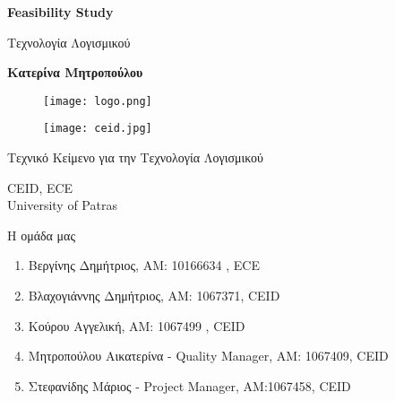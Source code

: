 \documentclass{article}
\begin{document}

\begin{titlepage}
   \begin{center}
       \vspace*{1cm}

       \textbf{\huge Feasibility Study}

       \vspace{0.5cm}
        Τεχνολογία Λογισμικού
            
       \vspace{1cm}

       \textbf{Κατερίνα Μητροπούλου}
       
       \begin{figure}[!htb]
        \centering
        \texttt{[image: logo.png]}
        \end{figure}
        
        \vspace{0.5cm}
        
        \begin{figure}[!htb]
        \centering
        \texttt{[image: ceid.jpg]}
        \end{figure}


       \vfill
            
       Τεχνικό Κείμενο για την Τεχνολογία Λογισμικού\\
            
       \vspace{0.5cm}
            
       CEID, ECE\\
       University of Patras\\
            
   \end{center}
\end{titlepage}



\noindent Η ομάδα μας

\begin{enumerate}
  \item Βεργίνης Δημήτριος, ΑΜ: 10166634 , ECE
  \item Βλαχογιάννης Δημήτριος, ΑΜ: 1067371, CEID
  \item Κούρου Αγγελική, ΑΜ: 1067499 , CEID
  \item Μητροπούλου Αικατερίνα - Quality Manager, ΑΜ: 1067409, CEID
  \item Στεφανίδης Μάριος - Project Manager, ΑΜ:1067458, CEID
\end{enumerate}
\end{document}

